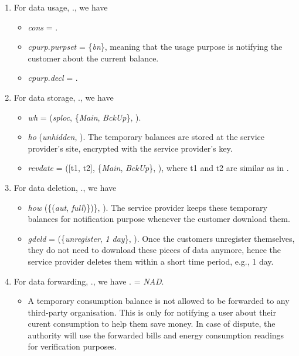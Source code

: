 \documentclass[a4paper]{article}
\begin{document}
\begin{enumerate}
\item For data usage, ., we have 
\begin{itemize}
\item \textit{cons} = . 
\item  \textit{cpurp}.\textit{purpset} = \{\textit{bn}\}, meaning that the usage purpose is notifying the customer about the current balance. 
\item \textit{cpurp}.\textit{decl} = .  
\end{itemize}

\item For data storage, ., we have 
\begin{itemize} 
\item \textit{wh} = (\textit{sploc}, \{\textit{Main}, \textit{BckUp}\}, ).     

\item \textit{ho}  (\textit{unhidden}, ). The temporary balances are stored at the service provider's site, encrypted with the service provider's key. 

\item \textit{revdate} = ([t1, t2],  \{\textit{Main}, \textit{BckUp}\}, ), where t1 and t2 are similar as in .   
\end{itemize}   

\item For data deletion, ., we have 
\begin{itemize} 
\item \textit{how}  (\{(\textit{aut}, \textit{full})\})\}, ). The service provider keeps these temporary  balances for notification purpose whenever the customer download them. 

\item \textit{gdeld} = (\{\textit{unregister}, \textit{1 day}\}, ).  Once the customers unregister themselves, they do not need to download these pieces of data anymore, hence the service provider deletes them within a short time period, e.g., 1 day.  
\end{itemize}   

\item For data forwarding, ., we have  . = \textit{NAD}. 

\begin{itemize}
\item A temporary consumption balance is not allowed to be forwarded to any third-party organisation. This is only for notifying a user about their curent consumption to help them save money. In case of dispute, the authority will use the forwarded bills and energy consumption readings for verification purposes.    
\end{itemize}   

 
\end{enumerate} 
    
\end{document}
